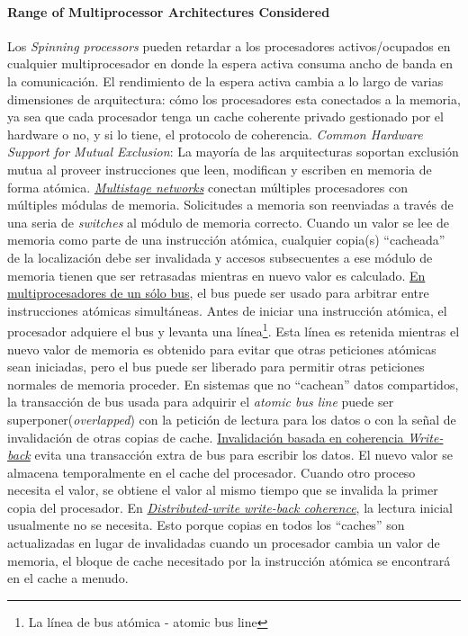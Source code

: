 \paragraph{\textnormal{\textbf{Range of Multiprocessor Architectures Considered}}}
Los \textit{Spinning processors} pueden retardar a los procesadores activos/ocupados en cualquier multiprocesador en donde la espera activa consuma ancho de banda en la comunicación. El rendimiento de la espera activa cambia a lo largo de varias dimensiones de arquitectura: cómo los procesadores esta conectados a la memoria, ya sea que cada procesador tenga un cache coherente privado gestionado por el hardware o no, y si lo tiene, el protocolo de coherencia. \textit{Common Hardware Support for Mutual Exclusion}: La mayoría de las arquitecturas soportan exclusión mutua al proveer instrucciones que leen, modifican y escriben en memoria de forma atómica. \underline{\textit{Multistage networks}} conectan múltiples procesadores con múltiples módulas de memoria. Solicitudes a memoria son reenviadas a través de una seria de \textit{switches} al módulo de memoria correcto. Cuando un valor se lee de memoria como parte de una instrucción atómica, cualquier copia(s) ``cacheada'' de la localización debe ser invalidada y accesos subsecuentes a ese módulo de memoria tienen que ser retrasadas mientras en nuevo valor es calculado. \underline{En multiprocesadores de un sólo bus}, el bus puede ser usado para arbitrar entre instrucciones atómicas simultáneas. Antes de iniciar una instrucción atómica, el procesador adquiere el bus y levanta una línea\footnote{La línea de bus atómica - atomic bus line}. Esta línea es retenida mientras el nuevo valor de memoria es obtenido para evitar que otras peticiones atómicas sean iniciadas, pero el bus puede ser liberado para permitir otras peticiones normales de memoria proceder. En sistemas que no ``cachean'' datos compartidos, la transacción de bus usada para adquirir el \textit{atomic bus line} puede ser superponer(\textit{overlapped}) con la petición de lectura para los datos o con la señal de invalidación de otras copias de cache. \underline{Invalidación basada en coherencia \textit{Write-back}} evita una transacción extra de bus para escribir los datos. El nuevo valor se almacena temporalmente en el cache del procesador. Cuando otro proceso necesita el valor, se obtiene el valor al mismo tiempo que se invalida la primer copia del procesador. En \underline{\textit{Distributed-write write-back coherence}}, la lectura inicial usualmente no se necesita. Esto porque copias en todos los ``caches'' son actualizadas en lugar de invalidadas cuando un procesador cambia un valor de memoria, el bloque de cache necesitado por la instrucción atómica se encontrará en el cache a menudo.

